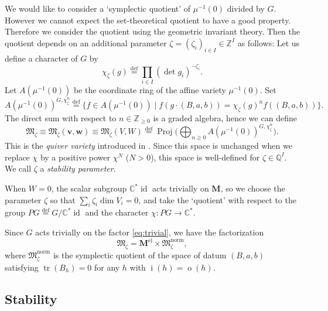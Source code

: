 \documentclass[11pt]{article}
\theoremstyle{definition}
\numberwithin{equation}{section}
\newcommand{\defeq}{\overset{\operatorname{\scriptstyle def}}{=}}
\newcommand{\C}{{\mathbb C}}
\newcommand{\Z}{{\mathbb Z}}
\newcommand{\Q}{{\mathbb Q}}
\newcommand{\tr}{\operatorname{tr}}
\newcommand{\vin}[1]{\operatorname{i}(#1)} %
\newcommand{\vout}[1]{\operatorname{o}(#1)} %
\newcommand{\bM}{{\mathbf M}} %
\newcommand{\M}{{\mathfrak M}} %
\newcommand{\bv}{{\mathbf v}} %
\newcommand{\bw}{{\mathbf w}} %
\begin{document}
We would like to consider a `symplectic quotient' of $\mu^{-1}(0)$
divided by $G$.
However we cannot expect the set-theoretical quotient
to have a good property. Therefore we consider the quotient using the
geometric invariant theory. Then the quotient depends on an additional
parameter $\zeta = (\zeta_i)_{i\in I}\in \Z^I$ as follows:
%
Let us def\/ine a character of $G$ by
\begin{equation*}
  \chi_\zeta(g) \defeq \prod_{i\in I} \left(\det g_i\right)^{-\zeta_i}.
\end{equation*}
Let $A(\mu^{-1}(0))$ be the coordinate ring of the af\/f\/ine variety
$\mu^{-1}(0)$. Set
\begin{equation*}
   A(\mu^{-1}(0))^{G,\chi_\zeta^n}
   \defeq \{ f\in A(\mu^{-1}(0)) \mid f(g\cdot(B,a,b))
   = \chi_\zeta(g)^n f((B,a,b)) \}.
\end{equation*}
The direct sum with respect to $n\in\Z_{\ge 0}$ is a graded algebra,
hence we can def\/ine
\begin{equation*}
   \M_\zeta \equiv \M_\zeta(\bv,\bw) \equiv \M_\zeta(V,W)
   \defeq \operatorname{Proj}\Big(\bigoplus_{n\ge 0}
   A(\mu^{-1}(0))^{G,\chi_\zeta^n}\Big).
\end{equation*}
This is the {\it quiver variety\/} introduced in \cite{Na-quiver}.
Since this space is unchanged when we replace $\chi$ by a positive power
$\chi^N$ ($N > 0$), this space is well-def\/ined for $\zeta\in \Q^I$.
We call $\zeta$ a {\it stability parameter}.

When $W = 0$, the scalar subgroup $\C^*\operatorname{id}$ acts
trivially on $\bM$, so we choose the parameter $\zeta$ so that
$\sum_i \zeta_i \dim V_i = 0$, and take the `quotient' with respect to
the group $PG \defeq G/\C^*\operatorname{id}$ and the character
$\chi\colon PG\to \C^*$.

Since $G$ acts trivially on the factor \eqref{eq:trivial}, we have the
factorization
\begin{equation}\label{eq:fac}
    \M_\zeta = \bM^{\text{el}} \times \M_\zeta^{\text{norm}},
\end{equation}
where $\M_\zeta^{\text{norm}}$ is the symplectic quotient of the space
of datum $(B,a,b)$ satisfying $\tr(B_h) = 0$ for any $h$ with $\vin{h}
= \vout{h}$.

\subsection{Stability}\label{subsec:stability}
\end{document}
